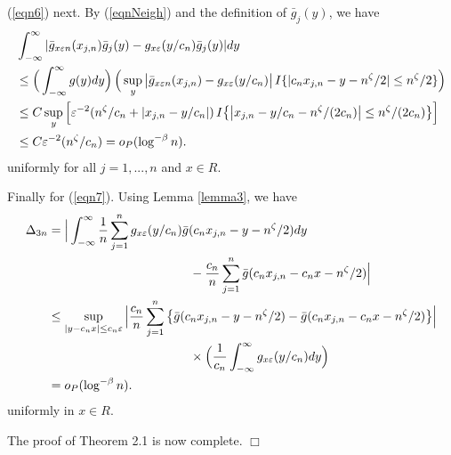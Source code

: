 (\ref{eqn6}) next. By (\ref{eqnNeigh}) and the definition of $\bar{g}_j(y)$, we have
\begin{align}
&\int_{-\infty}^{\infty} | \bar{g}_{x\varepsilon n}(x_{j,n}) \bar{g}_j(y) - g_{x \varepsilon}(y / c_n) \bar{g}_j(y)  | dy\nonumber\\
&\le \Big ( \int_{-\infty}^{\infty} g(y) dy \Big ) \, \Big ( \sup_y \big | \bar{g}_{x\varepsilon n}(x_{j,n})  - g_{x \varepsilon}(y / c_n)  \big |\,  I\{ | c_n x_{j, n} - y - n^{\zeta} / 2| \le n^{\zeta} / 2\} \Big ) \nonumber\\
&\le C \sup_y \Big [ \varepsilon^{-2} ( n^{\zeta} / c_n + |x_{j, n} - y / c_n | ) \,  I\big \{ \big | x_{j, n} - y / c_n - n^{\zeta} /(2c_n)\big | \le n^{\zeta} / (2c_n)\big \} \Big ] \nonumber\\
&\le C\varepsilon^{-2} ( n^{\zeta} / c_n ) = o_{P} (\log^{-\beta} n). \nonumber
\end{align}
uniformly for all $j = 1, ..., n$ and $x \in R$.

Finally for (\ref{eqn7}). Using Lemma \ref{lemma3}, we have
\begin{align}
\Delta_{3n} &=\Big{|}\int_{-\infty}^{\infty}\frac{1}{n}\sum_{j=1}^{n}g_{x\varepsilon}(y/c_n)\bar g(c_nx_{j,n}-y-n^{\zeta}/2)dy\no\\
&\hskip 4cm -\frac{c_n}{n}\sum_{j=1}^{n}\bar g(c_nx_{j,n}-c_n x-n^{\zeta} / 2)\Big{|}\no\\
&\leq\sup_{|y-c_nx|\leq c_{n}\varepsilon}\Big{|} \frac{c_n}{{n}}\sum_{j=1}^{n} \big \{ \bar g(c_nx_{j,n}-y-n^{\zeta}/2)-\bar g(c_nx_{j,n}-c_nx-n^{\zeta}/2) \big \}\Big{|} \no\\
&\hskip 4cm \times \Big(\frac{1}{c_{n}}\int_{-\infty}^{\infty}g_{x\varepsilon}(y/c_n)dy \Big )\no\\
&= o_{P}(\log^{-\beta} n).
\end{align}
uniformly in $x \in R$.

The proof of Theorem 2.1 is now complete. $\Box$





